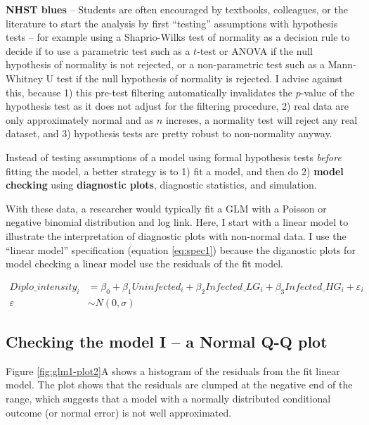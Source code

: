 \documentclass[]{book}
\begin{document}
\textbf{NHST blues} -- Students are often encouraged by textbooks, colleagues, or the literature to start the analysis by first ``testing'' assumptions with hypothesis tests -- for example using a Shaprio-Wilks test of normality as a decision rule to decide if to use a parametric test such as a \(t\)-test or ANOVA if the null hypothesis of normality is not rejected, or a non-parametric test such as a Mann-Whitney U test if the null hypothesis of normality is rejected. I advise against this, because 1) this pre-test filtering automatically invalidates the \(p\)-value of the hypothesis test as it does not adjust for the filtering procedure, 2) real data are only approximately normal and as \(n\) increses, a normality test will reject any real dataset, and 3) hypothesis tests are pretty robust to non-normality anyway.

Instead of testing assumptions of a model using formal hypothesis tests \emph{before} fitting the model, a better strategy is to 1) fit a model, and then do 2) \textbf{model checking} using \textbf{diagnostic plots}, diagnostic statistics, and simulation.

With these data, a researcher would typically fit a GLM with a Poisson or negative binomial distribution and log link. Here, I start with a linear model to illustrate the interpretation of diagnostic plots with non-normal data. I use the ``linear model'' specification (equation \eqref{eq:spec1}) because the diganostic plots for model checking a linear model use the residuals of the fit model.

\begin{align}
Diplo\_intensity_i &= \beta_0 + \beta_1 Uninfected_i + \beta_2 Infected\_LG_i + \beta_3 Infected\_HG_i + \varepsilon_i \\
\varepsilon &\sim N(0, \sigma)
\label{eq:worm-lm}
\end{align}

\hypertarget{checking-the-model-i-a-normal-q-q-plot}{%
\subsection{Checking the model I -- a Normal Q-Q plot}\label{checking-the-model-i-a-normal-q-q-plot}}

Figure \ref{fig:glm1-plot2}A shows a histogram of the residuals from the fit linear model. The plot shows that the residuals are clumped at the negative end of the range, which suggests that a model with a normally distributed conditional outcome (or normal error) is not well approximated.
\end{document}
